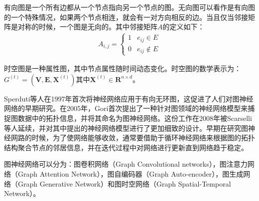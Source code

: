 \begin{definition}[有向图]
\label{def:directed-graph}
有向图是一个所有边都从一个节点指向另一个节点的图。无向图可以看作是有向图的一个特殊情况，如果两个节点相连，就会有一对方向相反的边。当且仅当邻接矩阵是对称的时候，一个图是无向的。其中邻接矩阵$A$的定义如下：
\begin{align}
    A_{i,j} = \begin{cases}
      1 & e_{ij} \in E \\
      0 & e_{ij} \notin E
    \end{cases}
  \end{align}
\end{definition}

\begin{definition}[时空图]
\label{def:spatial-temporal-graph}
时空图是一种属性图，其中节点属性随时间动态变化。时空图的数学表示为：$G^{(t)}=\left(\mathbf{V}, \mathbf{E}, \mathbf{X}^{(t)}\right) \text{其中} \mathbf{X}^{(t)} \in \mathbf{R}^{n \times d}$。
\end{definition}

Sperduti\cite{sperduti1997supervised}等人在1997年首次将神经网络应用于有向无环图，这促进了人们对图神经网络的早期研究。在2005年，Gori\cite{gori2005new}首次提出了一种针对图领域的神经网络模型来捕捉图数据中的拓扑信息，并将其命名为图神经网络。这份工作在2008年被Scarselli\cite{scarselli2008graph}等人延续，并对其中提出的神经网络模型进行了更加细致的设计。早期在研究图神经网路的时候，为了使网络能够收敛，通常要借助于循环神经网络来根据图的拓扑结构聚合节点的邻居信息，并在迭代过程中对网络进行更新直到网络趋于稳定。

图神经网络可以分为：图卷积网络（Graph Convolutional networks），图注意力网络（Graph Attention Network），图自编码器（Graph Auto-encoder），图生成网络（Graph Generative Network）和图时空网络（Graph Spatial-Temporal Network）。


